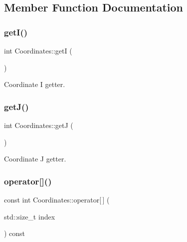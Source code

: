 \subsection{Member Function Documentation}
\mbox{\label{class_coordinates_a5f5709f7344088056ce16636140dfcef}} 
\subsubsection{\texorpdfstring{get\+I()}{getI()}}
{\footnotesize\ttfamily int Coordinates\+::getI (\begin{DoxyParamCaption}{ }\end{DoxyParamCaption})\hspace{0.3cm}{\ttfamily [inline]}}



Coordinate I getter. 

\mbox{\label{class_coordinates_ab9a94dc522140925ab3b05fe9a2b9f17}} 
\subsubsection{\texorpdfstring{get\+J()}{getJ()}}
{\footnotesize\ttfamily int Coordinates\+::getJ (\begin{DoxyParamCaption}{ }\end{DoxyParamCaption})\hspace{0.3cm}{\ttfamily [inline]}}



Coordinate J getter. 

\mbox{\label{class_coordinates_aa0645b4894d9d34cd78a4c6a1b44e30c}} 
\subsubsection{\texorpdfstring{operator[]()}{operator[]()}}
{\footnotesize\ttfamily const int Coordinates\+::operator\mbox{[}$\,$\mbox{]} (\begin{DoxyParamCaption}\item[{std\+::size\+\_\+t}]{index }\end{DoxyParamCaption}) const\hspace{0.3cm}{\ttfamily [inline]}}



